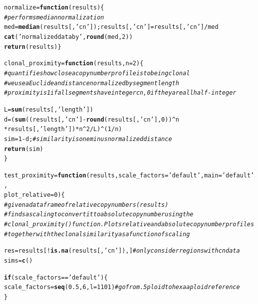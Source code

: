 \documentclass[12pt]{article}\usepackage[]{graphicx}\usepackage[]{color}
\makeatletter
\newcommand{\hlnum}[1]{\textcolor[rgb]{0.686,0.059,0.569}{#1}}%
\newcommand{\hlstr}[1]{\textcolor[rgb]{0.192,0.494,0.8}{#1}}%
\newcommand{\hlcom}[1]{\textcolor[rgb]{0.678,0.584,0.686}{\textit{#1}}}%
\newcommand{\hlopt}[1]{\textcolor[rgb]{0,0,0}{#1}}%
\newcommand{\hlstd}[1]{\textcolor[rgb]{0.345,0.345,0.345}{#1}}%
\newcommand{\hlkwa}[1]{\textcolor[rgb]{0.161,0.373,0.58}{\textbf{#1}}}%
\newcommand{\hlkwb}[1]{\textcolor[rgb]{0.69,0.353,0.396}{#1}}%
\newcommand{\hlkwc}[1]{\textcolor[rgb]{0.333,0.667,0.333}{#1}}%
\newcommand{\hlkwd}[1]{\textcolor[rgb]{0.737,0.353,0.396}{\textbf{#1}}}%
\newenvironment{kframe}{%
 \def\at@end@of@kframe{}%
 \ifinner\ifhmode%
  \def\at@end@of@kframe{\end{minipage}}%
  \begin{minipage}{\columnwidth}%
 \fi\fi%
 \def\FrameCommand##1{\hskip\@totalleftmargin \hskip-\fboxsep
 \colorbox{shadecolor}{##1}\hskip-\fboxsep
     \hskip-\linewidth \hskip-\@totalleftmargin \hskip\columnwidth}%
 \MakeFramed {\advance\hsize-\width
   \@totalleftmargin\z@ \linewidth\hsize
   \@setminipage}}%
 {\par\unskip\endMakeFramed%
 \at@end@of@kframe}
\newenvironment{knitrout}{}{} %
\makeatother
\begin{document}
\begin{knitrout}
\color{fgcolor}\begin{kframe}
\begin{alltt}
\hlstd{normalize} \hlkwb{=} \hlkwa{function}\hlstd{(}\hlkwc{results}\hlstd{)\{}
  \hlcom{#performs median normalization}
  \hlstd{med} \hlkwb{=} \hlkwd{median}\hlstd{(results[,}\hlstr{'cn'}\hlstd{]); results[,}\hlstr{'cn'}\hlstd{]}\hlkwb{=}\hlstd{results[,}\hlstr{'cn'}\hlstd{]}\hlopt{/}\hlstd{med}
  \hlkwd{cat}\hlstd{(}\hlstr{'normalized data by'}\hlstd{,} \hlkwd{round}\hlstd{(med,} \hlnum{2}\hlstd{))}
  \hlkwd{return}\hlstd{(results)\}}

\hlstd{clonal_proximity} \hlkwb{=} \hlkwa{function}\hlstd{(}\hlkwc{results}\hlstd{,} \hlkwc{n}\hlstd{=}\hlnum{2}\hlstd{)\{}
  \hlcom{#quantifies how close a copy number profile is to being clonal}
  \hlcom{#we use a Euclidean distance normalized by segment length}
  \hlcom{#proximity is 1 if all segments have integer cn, 0 if they are all half-integer}

  \hlstd{L} \hlkwb{=} \hlkwd{sum}\hlstd{(results[,}\hlstr{'length'}\hlstd{])}
  \hlstd{d} \hlkwb{=} \hlstd{(} \hlkwd{sum}\hlstd{( (results[,}\hlstr{'cn'}\hlstd{]} \hlopt{-} \hlkwd{round}\hlstd{(results[,}\hlstr{'cn'}\hlstd{],}\hlnum{0}\hlstd{) )}\hlopt{^}\hlstd{n}
             \hlopt{*} \hlstd{results[,}\hlstr{'length'}\hlstd{] )}\hlopt{*}\hlstd{n}\hlopt{^}\hlnum{2}\hlopt{/}\hlstd{L )}\hlopt{^}\hlstd{(}\hlnum{1}\hlopt{/}\hlstd{n)}
  \hlstd{sim} \hlkwb{=} \hlnum{1}\hlopt{-}\hlstd{d;} \hlcom{#similarity is one minus normalized distance}
  \hlkwd{return}\hlstd{(sim)}
\hlstd{\}}

\hlstd{test_proximity} \hlkwb{=} \hlkwa{function}\hlstd{(} \hlkwc{results}\hlstd{,} \hlkwc{scale_factors} \hlstd{=} \hlstr{'default'}\hlstd{,} \hlkwc{main}\hlstd{=}\hlstr{'default'}\hlstd{,}
                           \hlkwc{plot_relative} \hlstd{=} \hlnum{0}\hlstd{)\{}
  \hlcom{#given a dataframe of relative copy numbers (results)}
  \hlcom{#finds a scaling to convert it to absolute copy number using the}
  \hlcom{#clonal_proximity() function. Plots relative and absolute copy number profiles}
  \hlcom{#together with the clonal similarity as a function of scaling}

  \hlstd{res} \hlkwb{=} \hlstd{results[} \hlopt{!}\hlkwd{is.na}\hlstd{(results[,}\hlstr{'cn'}\hlstd{]), ]} \hlcom{#only consider regions with cn data}
  \hlstd{sims} \hlkwb{=} \hlkwd{c}\hlstd{()}

  \hlkwa{if} \hlstd{(scale_factors} \hlopt{==} \hlstr{'default'}\hlstd{)\{}
    \hlstd{scale_factors} \hlkwb{=} \hlkwd{seq}\hlstd{(} \hlnum{0.5}\hlstd{,} \hlnum{6}\hlstd{,} \hlkwc{l}\hlstd{=}\hlnum{1101} \hlstd{)} \hlcom{#go from .5ploid to hexaaploid reference}
  \hlstd{\}}


\end{alltt}
\end{kframe}
\end{knitrout}
\end{document}
